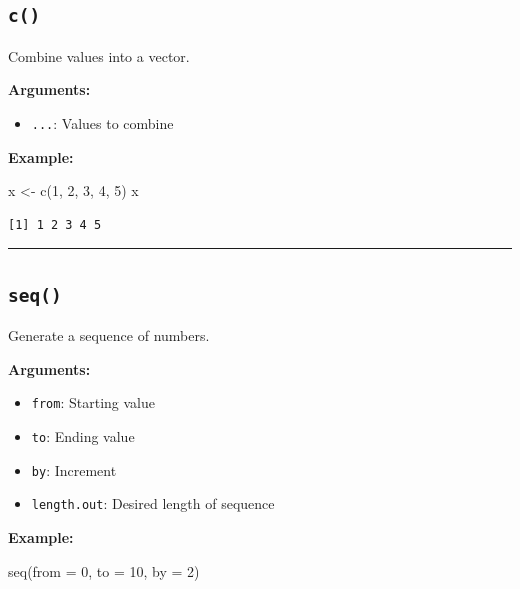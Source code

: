 \documentclass[
  letterpaper,
  DIV=11,
  numbers=noendperiod]{scrreprt}
\newenvironment{Shaded}{\begin{snugshade}}{\end{snugshade}}
\newcommand{\AttributeTok}[1]{\textcolor[rgb]{0.40,0.45,0.13}{#1}}
\newcommand{\DecValTok}[1]{\textcolor[rgb]{0.68,0.00,0.00}{#1}}
\newcommand{\FunctionTok}[1]{\textcolor[rgb]{0.28,0.35,0.67}{#1}}
\newcommand{\NormalTok}[1]{\textcolor[rgb]{0.00,0.23,0.31}{#1}}
\newcommand{\OtherTok}[1]{\textcolor[rgb]{0.00,0.23,0.31}{#1}}
\providecommand{\tightlist}{%
  \setlength{\itemsep}{0pt}\setlength{\parskip}{0pt}}
\begin{document}
\subsection{\texorpdfstring{\texttt{c()}}{c()}}\label{c}

Combine values into a vector.

\textbf{Arguments:}

\begin{itemize}
\tightlist
\item
  \texttt{...}: Values to combine
\end{itemize}

\textbf{Example:}

\begin{Shaded}
\begin{Highlighting}[]
\NormalTok{x }\OtherTok{\textless{}{-}} \FunctionTok{c}\NormalTok{(}\DecValTok{1}\NormalTok{, }\DecValTok{2}\NormalTok{, }\DecValTok{3}\NormalTok{, }\DecValTok{4}\NormalTok{, }\DecValTok{5}\NormalTok{)}
\NormalTok{x}
\end{Highlighting}
\end{Shaded}

\begin{verbatim}
[1] 1 2 3 4 5
\end{verbatim}

\begin{center}\rule{0.5\linewidth}{0.5pt}\end{center}

\subsection{\texorpdfstring{\texttt{seq()}}{seq()}}\label{seq}

Generate a sequence of numbers.

\textbf{Arguments:}

\begin{itemize}
\tightlist
\item
  \texttt{from}: Starting value
\item
  \texttt{to}: Ending value
\item
  \texttt{by}: Increment
\item
  \texttt{length.out}: Desired length of sequence
\end{itemize}

\textbf{Example:}

\begin{Shaded}
\begin{Highlighting}[]
\FunctionTok{seq}\NormalTok{(}\AttributeTok{from =} \DecValTok{0}\NormalTok{, }\AttributeTok{to =} \DecValTok{10}\NormalTok{, }\AttributeTok{by =} \DecValTok{2}\NormalTok{)}
\end{Highlighting}
\end{Shaded}
\end{document}
